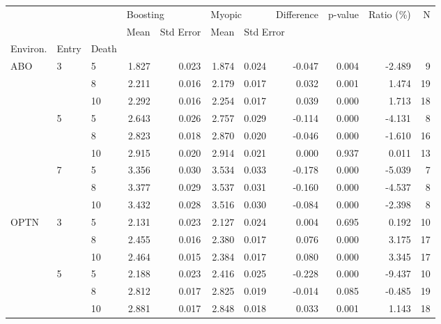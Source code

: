 \begin{tabular}{lllrrrrrrrr}
\toprule
    &   &    & \multicolumn{2}{l}{Boosting} & \multicolumn{2}{l}{Myopic} & Difference & p-value & Ratio (\%) &   N \\
    &   &    &     Mean & Std Error &   Mean & \multicolumn{5}{l}{Std Error} \\
Environ. & Entry & Death &          &           &        &           &            &         &           &     \\
\midrule
ABO & 3 & 5  &    1.827 &     0.023 &  1.874 &     0.024 &     -0.047 &   0.004 &    -2.489 &   9 \\
    &   & 8  &    2.211 &     0.016 &  2.179 &     0.017 &      0.032 &   0.001 &     1.474 &  19 \\
    &   & 10 &    2.292 &     0.016 &  2.254 &     0.017 &      0.039 &   0.000 &     1.713 &  18 \\
    & 5 & 5  &    2.643 &     0.026 &  2.757 &     0.029 &     -0.114 &   0.000 &    -4.131 &   8 \\
    &   & 8  &    2.823 &     0.018 &  2.870 &     0.020 &     -0.046 &   0.000 &    -1.610 &  16 \\
    &   & 10 &    2.915 &     0.020 &  2.914 &     0.021 &      0.000 &   0.937 &     0.011 &  13 \\
    & 7 & 5  &    3.356 &     0.030 &  3.534 &     0.033 &     -0.178 &   0.000 &    -5.039 &   7 \\
    &   & 8  &    3.377 &     0.029 &  3.537 &     0.031 &     -0.160 &   0.000 &    -4.537 &   8 \\
    &   & 10 &    3.432 &     0.028 &  3.516 &     0.030 &     -0.084 &   0.000 &    -2.398 &   8 \\
OPTN & 3 & 5  &    2.131 &     0.023 &  2.127 &     0.024 &      0.004 &   0.695 &     0.192 &  10 \\
    &   & 8  &    2.455 &     0.016 &  2.380 &     0.017 &      0.076 &   0.000 &     3.175 &  17 \\
    &   & 10 &    2.464 &     0.015 &  2.384 &     0.017 &      0.080 &   0.000 &     3.345 &  17 \\
    & 5 & 5  &    2.188 &     0.023 &  2.416 &     0.025 &     -0.228 &   0.000 &    -9.437 &  10 \\
    &   & 8  &    2.812 &     0.017 &  2.825 &     0.019 &     -0.014 &   0.085 &    -0.485 &  19 \\
    &   & 10 &    2.881 &     0.017 &  2.848 &     0.018 &      0.033 &   0.001 &     1.143 &  18 \\

\end{tabular}
